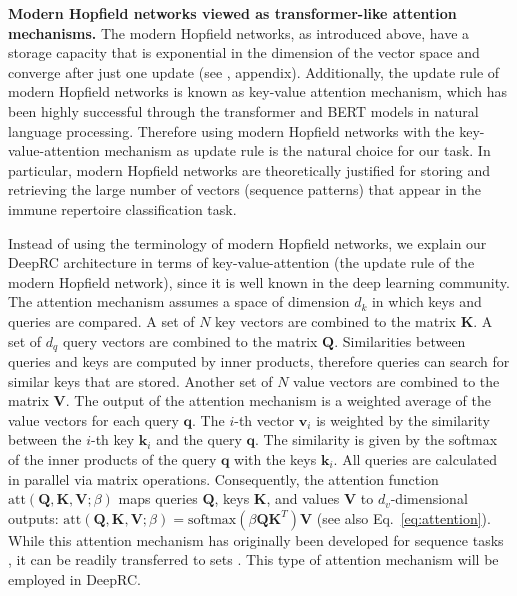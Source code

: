 \documentclass[oneside]{book}
\newcommand\Bk{\bm{k}}
\newcommand\Bq{\bm{q}}
\newcommand\Bv{\bm{v}}
\newcommand\BK{\bm{K}}
\newcommand\BQ{\bm{Q}}
\newcommand\BV{\bm{V}}
\newcommand\att{\mathrm{att}}
\newcommand{\soft}{\mathrm{softmax}}
\begin{document}
\textbf{Modern Hopfield networks viewed as transformer-like attention mechanisms.}
%
The modern Hopfield networks, as introduced above,%
have a storage capacity that is exponential in the dimension
of the vector space and converge after just
one update (see \citep{Ramsauer:20}, appendix).%
Additionally, the update rule of modern Hopfield networks is 
known as key-value attention mechanism,
which has been highly successful through the transformer \citep{vaswani2017attention} and BERT
\citep{Devlin:19} models in natural language 
processing.
%
Therefore using modern Hopfield networks with
the key-value-attention mechanism as update rule is 
the natural choice for our task.
In particular, modern Hopfield networks are 
theoretically justified for storing and retrieving
the large number of vectors (sequence patterns) that appear 
in the immune repertoire classification task. 

Instead of using the terminology of modern Hopfield networks,
we explain our DeepRC architecture in terms of 
key-value-attention
(the update rule of the modern Hopfield network),
since it is well known in the deep learning community.
The attention mechanism assumes a space of dimension $d_k$
in which keys and queries are compared.
%
A set of $N$ key vectors  
are combined to the matrix 
$\BK$.
A set of $d_{q}$ query vectors
are combined to the matrix $\BQ$.
Similarities between queries and keys are computed by inner products,
therefore queries can search for similar keys that are stored.
Another set of $N$ value vectors  
are combined to the matrix $\BV$.
The output of the attention mechanism is 
a weighted average of the value vectors for each query $\Bq$.
The $i$-th vector $\Bv_i$ is weighted by the similarity 
between the $i$-th key $\Bk_i$ and the query $\Bq$.
The similarity is given by the softmax of the inner products of 
the query $\Bq$ with the keys $\Bk_i$. 
All queries are calculated in parallel via matrix operations.
Consequently, the attention function $\mathrm{att}(\BQ,\BK,\BV;\beta)$ 
maps queries $\BQ$, keys $\BK$, and values $\BV$ to 
$d_{v}$-dimensional outputs: $\att(\BQ,\BK,\BV; \beta) = \soft(\beta \BQ \BK^T) \BV$ (see also Eq.~\eqref{eq:attention}). 
%
While this attention mechanism has originally been developed for
sequence tasks \citep{vaswani2017attention}, it can be readily 
transferred to sets \citep{lee2019set,ye2018learning}.
This type of attention mechanism will be employed in DeepRC. 
\end{document}

